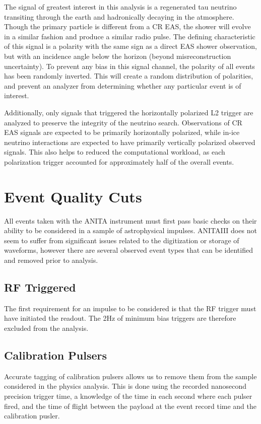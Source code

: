 		The signal of greatest interest in this analysis is a regenerated tau neutrino transiting through the earth and hadronically decaying in the atmosphere.  Though the primary particle is different from a CR EAS, the shower will evolve in a similar fashion and produce a similar radio pulse.  The defining characteristic of this signal is a polarity with the same sign as a direct EAS shower observation, but with an incidence angle below the horizon (beyond misreconstruction uncertainty).  To prevent any bias in this signal channel, the polarity of all events has been randomly inverted.  This will create a random distribution of polarities, and prevent an analyzer from determining whether any particular event is of interest.
		
		Additionally, only signals that triggered the horizontally polarized L2 trigger are analyzed to preserve the integrity of the neutrino search.  Observations of CR EAS signals are expected to be primarily horizontally polarized, while in-ice neutrino interactions are expected to have primarily vertically polarized observed signals.  This also helps to reduced the computational workload, as each polarization trigger accounted for approximately half of the overall events.
		
			
\section{Event Quality Cuts}
	All events taken with the ANITA instrument must first pass basic checks on their ability to be considered in a sample of astrophysical impulses.  ANITAIII does not seem to suffer from significant issues related to the digitization or storage of waveforms, however there are several observed event types that can be identified and removed prior to analysis.

	\subsection{RF Triggered}
		The first requirement for an impulse to be considered is that the RF trigger must have initiated the readout.  The 2Hz of minimum bias triggers are therefore excluded from the analysis.

	\subsection{Calibration Pulsers}
		Accurate tagging of calibration pulsers allows us to remove them from the sample considered in the physics analysis.  This is done using the recorded nanosecond precision trigger time, a knowledge of the time in each second where each pulser fired, and the time of flight between the payload at the event record time and the calibration pusler.
		
